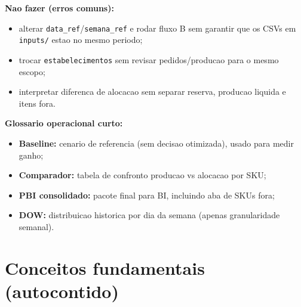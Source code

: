 \documentclass[11pt,a4paper]{article}
\begin{document}
\textbf{Nao fazer (erros comuns):}
\begin{itemize}[leftmargin=1.2cm]
    \item alterar \texttt{data\_ref}/\texttt{semana\_ref} e rodar fluxo B sem garantir que os CSVs em \texttt{inputs/} estao no mesmo periodo;
    \item trocar \texttt{estabelecimentos} sem revisar pedidos/producao para o mesmo escopo;
    \item interpretar diferenca de alocacao sem separar reserva, producao liquida e itens fora.
\end{itemize}

\textbf{Glossario operacional curto:}
\begin{itemize}[leftmargin=1.2cm]
    \item \textbf{Baseline:} cenario de referencia (sem decisao otimizada), usado para medir ganho;
    \item \textbf{Comparador:} tabela de confronto producao vs alocacao por SKU;
    \item \textbf{PBI consolidado:} pacote final para BI, incluindo aba de SKUs fora;
    \item \textbf{DOW:} distribuicao historica por dia da semana (apenas granularidade semanal).
\end{itemize}

\section{Conceitos fundamentais (autocontido)}
\end{document}
